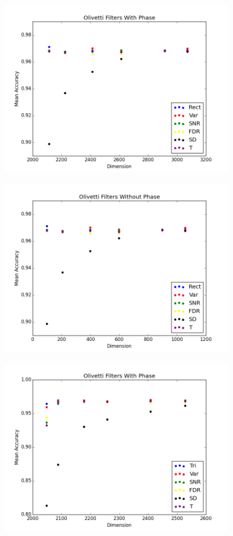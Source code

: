 \documentclass[12pt, letterpaper]{article}
\begin{document}
\begin{center}
	\begin{figure}[H]
		\centering
		\includegraphics[width=10cm, keepaspectratio]{fftAcc/o_filters_phase}
		\label{fig:gfop}
	\end{figure}
\end{center}

\begin{center}
	\begin{figure}[H]
		\centering
		\includegraphics[width=10cm, keepaspectratio]{fftAcc/o_filters_nophase}
		\label{fig:gfoop}
	\end{figure}
\end{center}

\begin{center}
	\begin{figure}[H]
		\centering
		\includegraphics[width=10cm, keepaspectratio]{fftAcc/o_filters_phase_1}
		\label{fig:gfopt}
	\end{figure}
\end{center}
\end{document}
